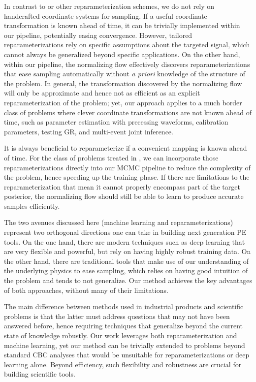 \documentclass[twocolumn]{aastex631}
\begin{document}
In contrast to \cite{Islam:2022afg,Roulet:2022kot} or other reparameterization
schemes, we do not rely on handcrafted coordinate systems for sampling. If a
useful coordinate transformation is known ahead of time, it can be trivially
implemented within our pipeline, potentially easing convergence. However,
tailored reparameterizations rely on specific assumptions about the targeted
signal, which cannot always be generalized beyond specific applications. On the
other hand, within our pipeline, the normalizing flow effectively discovers
reparameterizations that ease sampling automatically without \emph{a priori}
knowledge of the structure of the problem. In general, the transformation
discovered by the normalizing flow will only be approximate and hence not as
efficient as an explicit reparameterization of the problem; yet, our approach
applies to a much border class of problems where clever coordinate
transformations are not known ahead of time, such as parameter estimation with
precessing waveforms, calibration parameters, testing GR, and multi-event joint
inference.

It is always beneficial to reparameterize if a convenient mapping is known
ahead of time. For the class of problems treated in
\cite{Islam:2022afg,Roulet:2022kot}, we can incorporate those
reparameterizations directly into our MCMC pipeline to reduce the complexity of
the problem, hence speeding up the training phase. If there are limitations to
the reparameterization that mean it cannot properly encompass part of the
target posterior, the normalizing flow should still be able to learn to produce
accurate samples efficiently.

The two avenues discussed here (machine learning and reparameterizations)
represent two orthogonal directions one can take in building next generation PE
tools. On the one hand, there are modern techniques such as deep learning that
are very flexible and powerful, but rely on having highly robust training data.
On the other hand, there are traditional tools that make use of our
understanding of the underlying physics to ease sampling, which relies
on having good intuition of the problem and tends to not generalize.
Our method achieves the key advantages of both approaches, without many of their limitations.

The main difference between methods used in industrial products and scientific
problems is that the latter must address questions that may not have been
answered before, hence requiring techniques that generalize beyond the current
state of knowledge robustly. Our work leverages both reparameterization and
machine learning, yet our method can be trivially extended to problems beyond
standard CBC analyses that would be unsuitable for reparameterizations or deep
learning alone. Beyond efficiency, such flexibility and robustness are crucial
for building scientific tools.
\end{document}
